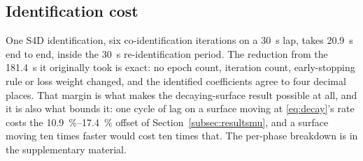 \subsection{Identification cost}
\label{subsec:runtime}

One S4D identification, six co-identification iterations on a \SI{30}{\second}
lap, takes \SI{20.9}{\second} end to end, inside the \SI{30}{\second}
re-identification period. The reduction from the \SI{181.4}{\second} it
originally took is exact: no epoch count, iteration count, early-stopping rule
or loss weight changed, and the identified coefficients agree to four decimal
places. That margin is what makes the decaying-surface result possible at all,
and it is also what bounds it: one cycle of lag on a surface moving at
\eqref{eq:decay}'s rate costs the \SIrange{10.9}{17.4}{\percent} offset of
Section~\ref{subsec:resultsmu}, and a surface moving ten times faster would cost
ten times that. The per-phase breakdown is in the supplementary material.
